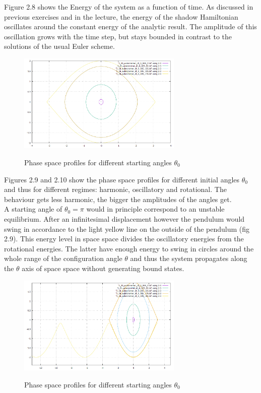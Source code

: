 \documentclass[12pt,a4paper]{article}	%
\begin{document}
Figure 2.8 shows the Energy of the system as a function of time. As discussed in previous exercises and in the lecture, the energy of the shadow Hamiltonian oscillates around the constant energy of the analytic result. The amplitude of this oscillation grows with the time step, but stays bounded in contrast to the solutions of the usual Euler scheme. 

\newpage



\begin{figure}[h!]		
\centering
{\includegraphics[width=0.7\textwidth]{phasespaceprofiles.png}}		
\caption{Phase space profiles for different starting angles $\theta_0$}
\end{figure}

Figures 2.9 and 2.10 show the phase space profiles for different initial angles $\theta_0$ and thus for different regimes: harmonic, oscillatory and rotational. The behaviour gets less harmonic, the bigger the amplitudes of the angles get. \\ 
A starting angle of $\theta_0 = \pi$ would in principle correspond to an unstable equilibrium. After an infinitesimal displacement however the pendulum would swing in accordance to the light yellow line on the outside of the pendulum (fig 2.9).
This energy level in space space divides the oscillatory energies from the rotational energies. The latter have enough energy to swing in circles around the whole range of the configuration angle $\theta$ and thus the system propagates along the $\theta$ axis of space space without generating bound states.  

\begin{figure}[h!]		
\centering
{\includegraphics[width=0.7\textwidth]{phasespaceprofiles2.png}}		
\caption{Phase space profiles for different starting angles $\theta_0$}
\end{figure}
\end{document}
